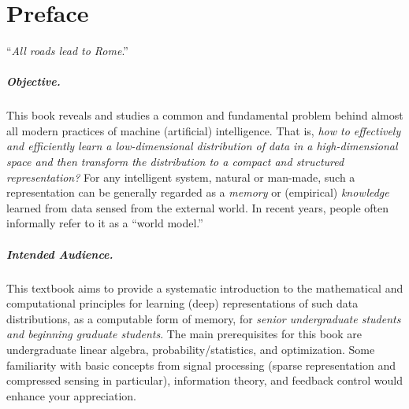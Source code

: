 \documentclass[../../book-main.tex]{subfiles}
\begin{document}
\chapter*{Preface}
\begin{center}
    ``{\em All roads lead to Rome}.''

\end{center}
\vspace{5mm}

\paragraph{Objective.}
This book reveals and studies a common and fundamental problem behind
almost all modern practices of machine (artificial) intelligence.
That is, {\em how to effectively and efficiently learn a
    low-dimensional distribution of data in a high-dimensional space and
    then transform the distribution to a compact and structured
representation?} For any intelligent system, natural or man-made,
such a representation can be generally regarded as a {\em memory} or (empirical)
{\em knowledge} learned from data sensed from the external world. In
recent years, people often informally refer to it as a ``world model.''

\paragraph{Intended Audience.}
This textbook aims to provide a systematic introduction to the
mathematical and computational principles for learning (deep)
representations of such data distributions, as a computable form of
memory, for {\em senior
undergraduate students and beginning graduate students}. The main
prerequisites for this book are undergraduate linear algebra,
probability/statistics, and optimization. Some familiarity with basic
concepts from signal processing (sparse representation and compressed
sensing in particular), information theory, and feedback control
would enhance your appreciation.
\end{document}
